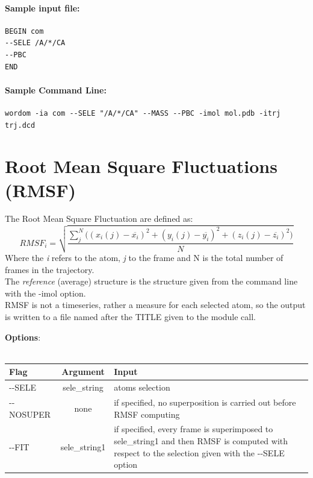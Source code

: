 \documentclass[11pt,twoside,onecolumn,a4paper,openright,notitlepage]{book}[2001/04/21]
\begin{document}
\paragraph*{Sample input file:}

\begin{verbatim}
BEGIN com
--SELE /A/*/CA 
--PBC
END
\end{verbatim}

\paragraph*{Sample Command Line:}

\begin{verbatim}
wordom -ia com --SELE "/A/*/CA" --MASS --PBC -imol mol.pdb -itrj trj.dcd
\end{verbatim}
\clearpage





\section{Root Mean Square Fluctuations (RMSF)}
The Root Mean Square Fluctuation are defined as:\\ 
\begin{equation}
RMSF_{i} = \sqrt{\frac{\sum_{j}^N\Big((x_{i}(j)-\overline{x_{i}})^{2}+(y_{i}(j)-\overline{y_{i}})^{2}+(z_{i}(j)-\overline{z_{i}})^{2}\Big)}{N}}
\end{equation}
Where the \emph{i} refers to the atom, \emph{j} to the frame and N is the total number of frames in the trajectory.\\
The \emph{reference} (average) structure is the structure given from the command line with the -imol option.\\
RMSF is not a timeseries, rather a measure for each selected atom, so the output is written to a file named after the TITLE given to the module call.

\textbf{\large Options}:\\\\
\begin{tabular}{l|c|p{7.5cm}}
Flag & Argument & Input \\
\hline
-{}-SELE          & sele\_string  & atoms selection\\
-{}-NOSUPER       & none          & if specified, no superposition is carried out before RMSF computing\\
-{}-FIT           & sele\_string1 & if specified, every frame is superimposed to sele\_string1 and then RMSF is computed with respect to the selection given with the -{}-SELE option \\
\end{tabular}\\\\
\end{document}
